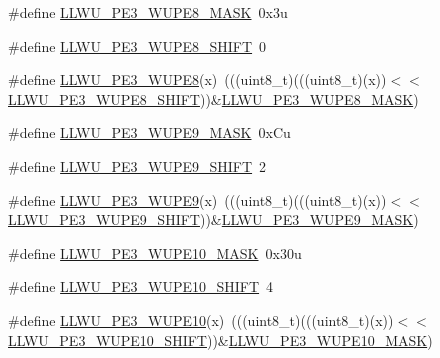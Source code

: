 \begin{DoxyCompactItemize}
\item 
\#define \hyperlink{group___l_l_w_u___register___masks_gabe7fce492e2c0201c4bb5af893f5a63d}{L\+L\+W\+U\+\_\+\+P\+E3\+\_\+\+W\+U\+P\+E8\+\_\+\+M\+A\+SK}~0x3u
\item 
\#define \hyperlink{group___l_l_w_u___register___masks_gaf02591badd7f37915120d0fd627cdf27}{L\+L\+W\+U\+\_\+\+P\+E3\+\_\+\+W\+U\+P\+E8\+\_\+\+S\+H\+I\+FT}~0
\item 
\#define \hyperlink{group___l_l_w_u___register___masks_gad6e40b93385848a0a6dc1177f884107a}{L\+L\+W\+U\+\_\+\+P\+E3\+\_\+\+W\+U\+P\+E8}(x)~(((uint8\+\_\+t)(((uint8\+\_\+t)(x))$<$$<$\hyperlink{group___l_l_w_u___register___masks_gaf02591badd7f37915120d0fd627cdf27}{L\+L\+W\+U\+\_\+\+P\+E3\+\_\+\+W\+U\+P\+E8\+\_\+\+S\+H\+I\+FT}))\&\hyperlink{group___l_l_w_u___register___masks_gabe7fce492e2c0201c4bb5af893f5a63d}{L\+L\+W\+U\+\_\+\+P\+E3\+\_\+\+W\+U\+P\+E8\+\_\+\+M\+A\+SK})
\item 
\#define \hyperlink{group___l_l_w_u___register___masks_gad03733955d18194da002aeceedc2edf5}{L\+L\+W\+U\+\_\+\+P\+E3\+\_\+\+W\+U\+P\+E9\+\_\+\+M\+A\+SK}~0x\+Cu
\item 
\#define \hyperlink{group___l_l_w_u___register___masks_ga26cad28b7fe4fd2da53ece9d3744016c}{L\+L\+W\+U\+\_\+\+P\+E3\+\_\+\+W\+U\+P\+E9\+\_\+\+S\+H\+I\+FT}~2
\item 
\#define \hyperlink{group___l_l_w_u___register___masks_ga644ab845edd61fbd851fca7254c6a3f0}{L\+L\+W\+U\+\_\+\+P\+E3\+\_\+\+W\+U\+P\+E9}(x)~(((uint8\+\_\+t)(((uint8\+\_\+t)(x))$<$$<$\hyperlink{group___l_l_w_u___register___masks_ga26cad28b7fe4fd2da53ece9d3744016c}{L\+L\+W\+U\+\_\+\+P\+E3\+\_\+\+W\+U\+P\+E9\+\_\+\+S\+H\+I\+FT}))\&\hyperlink{group___l_l_w_u___register___masks_gad03733955d18194da002aeceedc2edf5}{L\+L\+W\+U\+\_\+\+P\+E3\+\_\+\+W\+U\+P\+E9\+\_\+\+M\+A\+SK})
\item 
\#define \hyperlink{group___l_l_w_u___register___masks_ga6d8e812233df26a72459712117996efa}{L\+L\+W\+U\+\_\+\+P\+E3\+\_\+\+W\+U\+P\+E10\+\_\+\+M\+A\+SK}~0x30u
\item 
\#define \hyperlink{group___l_l_w_u___register___masks_ga1686c8515045158eeef3fc0c5df480d9}{L\+L\+W\+U\+\_\+\+P\+E3\+\_\+\+W\+U\+P\+E10\+\_\+\+S\+H\+I\+FT}~4
\item 
\#define \hyperlink{group___l_l_w_u___register___masks_ga5ba778d142ba95753b9eec4e9c5e73f6}{L\+L\+W\+U\+\_\+\+P\+E3\+\_\+\+W\+U\+P\+E10}(x)~(((uint8\+\_\+t)(((uint8\+\_\+t)(x))$<$$<$\hyperlink{group___l_l_w_u___register___masks_ga1686c8515045158eeef3fc0c5df480d9}{L\+L\+W\+U\+\_\+\+P\+E3\+\_\+\+W\+U\+P\+E10\+\_\+\+S\+H\+I\+FT}))\&\hyperlink{group___l_l_w_u___register___masks_ga6d8e812233df26a72459712117996efa}{L\+L\+W\+U\+\_\+\+P\+E3\+\_\+\+W\+U\+P\+E10\+\_\+\+M\+A\+SK})
$$
\end{DoxyCompactItemize}
